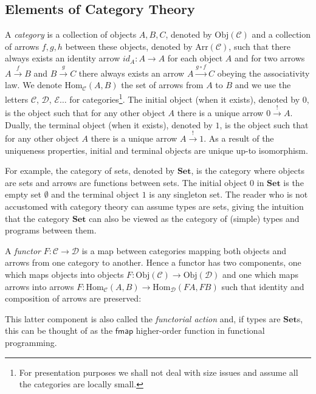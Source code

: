 \documentclass[a4paper,UKenglish,cleveref, autoref, thm-restate]{lipics-v2021}
\newcommand{\operator}[1]{\textsf{#1}}
\newcommand{\CatC}{\mathcal{C}}
\newcommand{\CatD}{\mathcal{D}}
\newcommand{\CatE}{\mathcal{E}}
\newcommand{\Set}{\mathbf{Set}}
\newcommand{\Hom}{\text{Hom}}
\newcommand{\Obj}{\text{Obj}}
\newcommand{\Arr}{\text{Arr}}
\begin{document}
\subsection{Elements of Category Theory}
A \emph{category} is a collection of objects $A, B, C$, denoted by $\Obj(\CatC)$
and a collection of arrows $f, g, h$ between these objects, denoted by $\Arr
(\CatC)$, such that there always exists an identity arrow $id_{A} : A \to A$ for
each object $A$ and for two arrows $A \xrightarrow{f} B$ and $B \xrightarrow{g}
C$ there always exists an arrow $A \xrightarrow{g\circ f} C$ obeying the
associativity law. We denote $\Hom_{\CatC} (A, B)$ the set of arrows from $A$ to
$B$ and we use the letters $\CatC$, $\CatD$, $\CatE\dots$ for
categories\footnote[1]{For presentation purposes we shall not deal with size
  issues and assume all the categories are locally small.}. The initial object (when it exists), denoted by $0$,
is the object such that for any other object $A$
there is a unique arrow $0 \xrightarrow{!} A$.  Dually, the terminal object (when it exists),
denoted by $1$, is the object such that for any other object $A$ there is a
unique arrow $A \xrightarrow{!} 1$. As a result of the uniqueness properties, initial and terminal objects are unique up-to
isomorphism.

For example, the category of sets, denoted by $\Set$, is the category where
objects are sets and arrows are functions between sets. The initial object $0$
in $\Set$ is the empty set $\emptyset$ and the terminal object $1$ is any
singleton set. The reader who is not accustomed with category theory can assume
types are sets, giving the intuition that the category $\Set$ can also be viewed
as the category of (simple) types and programs between them.

A \emph{functor} $F : \CatC \to \CatD$ is a map between categories mapping both
objects and arrows from one category to another. Hence a functor has two
components, one which maps objects into objects
$F : \Obj(\CatC) \to \Obj(\CatD)$ and one which maps arrows into arrows
$F : \Hom_{\CatC}(A, B) \to \Hom_{\CatD} (FA,FB)$ such that identity and
composition of arrows are preserved:
This latter component is also called the \emph{functorial action} and, if types
are $\Set$s, this can be thought of as the $\operator{fmap}$ higher-order
function in functional programming.
\end{document}
